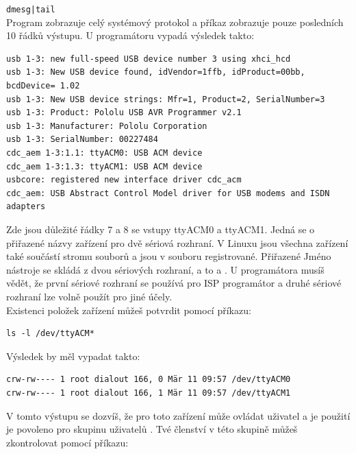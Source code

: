 \verb"dmesg|tail"\\
Program  zobrazuje celý systémový protokol a příkaz
 zobrazuje pouze posledních 10 řádků výstupu.
U programátoru  vypadá výsledek takto:
\vspace*{-.5em}
\begin{footnotesize} \begin{verbatim}
usb 1-3: new full-speed USB device number 3 using xhci_hcd
usb 1-3: New USB device found, idVendor=1ffb, idProduct=00bb, bcdDevice= 1.02
usb 1-3: New USB device strings: Mfr=1, Product=2, SerialNumber=3
usb 1-3: Product: Pololu USB AVR Programmer v2.1
usb 1-3: Manufacturer: Pololu Corporation
usb 1-3: SerialNumber: 00227484
cdc_aem 1-3:1.1: ttyACM0: USB ACM device
cdc_aem 1-3:1.3: ttyACM1: USB ACM device
usbcore: registered new interface driver cdc_acm
cdc_aem: USB Abstract Control Model driver for USB modems and ISDN adapters
\end{verbatim} \end{footnotesize}
\vspace*{-.5em}
Zde jsou důležité řádky 7 a 8 se vstupy ttyACM0 a ttyACM1.
Jedná se o přiřazené názvy zařízení pro dvě sériová rozhraní.
V Linuxu jsou všechna zařízení také součástí stromu souborů a jsou v
souboru  registrované. Přiřazené Jméno nástroje  se skládá
z dvou sériových rozhraní, a to  a .
U programátora   musíš vědět, že první sériové rozhraní
se používá pro ISP programátor a druhé sériové rozhraní
lze volně použít pro jiné účely.\\
Existenci položek zařízení můžeš potvrdit pomocí příkazu:
\begin{large} \vspace{-0.4em} \begin{verbatim}
ls -l /dev/ttyACM*
\end{verbatim} \end{large}
Výsledek by měl vypadat takto: 
\begin{footnotesize} \begin{verbatim}
crw-rw---- 1 root dialout 166, 0 Mär 11 09:57 /dev/ttyACM0
crw-rw---- 1 root dialout 166, 1 Mär 11 09:57 /dev/ttyACM1
\end{verbatim} \end{footnotesize}
V tomto výstupu se dozvíš, že pro toto zařízení může ovládat uživatel 
a je použití je povoleno pro skupinu uživatelů  .
Tvé členství v této skupině můžeš zkontrolovat pomocí příkazu:

